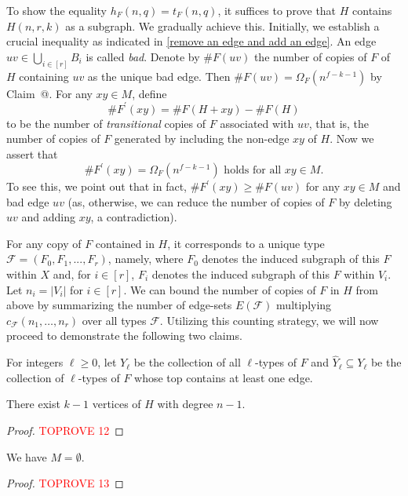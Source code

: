 \documentclass[10pt]{article}
\makeatletter
\newcommand*{\rom}[1]{\expandafter\@slowromancap\romannumeral #1@}
\makeatother
\begin{document}
To show the equality $h_F(n,q)=t_F(n,q)$, it suffices to prove that $H$ contains $H(n,r,k)$ as a subgraph.
We gradually achieve this.
Initially, we establish a crucial inequality as indicated in \eqref{remove an edge and add an edge}.
An edge $uv\in \bigcup_{i\in [r]} B_i$ is called {\it bad}.
Denote by $\#F(uv)$ the number of copies of $F$ of $H$ containing $uv$ as the unique bad edge.
Then $\#F(uv)=\Omega_F(n^{f-k-1})$ by Claim~\rom{3}.
For any $xy\in M$, define
$$\# F^\prime(xy)=\#F(H+xy)- \#F(H)$$
to be the number of {\it transitional} copies of $F$ associated with $uv$, that is, the number of copies of $F$ generated by including the non-edge $xy$ of $H$.
Now we assert that
\begin{equation}\label{remove an edge and add an edge}
\# F^\prime (xy)=\Omega_F(n^{f-k-1}) \mbox{ holds for all $xy\in M$}.
 \end{equation}
To see this, we point out that in fact, $\# F^\prime (xy)\geq \# F(uv)$ for any $xy\in M$ and bad edge $uv$
(as, otherwise, we can reduce the number of copies of $F$ by deleting $uv$ and adding $xy$, a contradiction).


For any copy of $F$ contained in $H$, it corresponds to a unique type $\mathcal{F}=(F_0,F_1,...,F_r)$, namely,
where $F_0$ denotes the induced subgraph of this $F$ within $X$ and, for $i\in [r]$, $F_i$ denotes the induced subgraph of this $F$ within $V_i$.
Let $n_i=|V_i|$ for $i\in [r]$.
We can bound the number of copies of $F$ in $H$ from above by summarizing the number of edge-sets $E(\mathcal{F})$ multiplying $c_{\mathcal{F}}(n_1,\ldots,n_r)$ over all types $\mathcal{F}$.
Utilizing this counting strategy, we will now proceed to demonstrate the following two claims.

For integers $\ell\geq 0$, let $Y_\ell$ be the collection of all $\ell$-types of $F$ and $\widehat{Y}_\ell \subseteq Y_\ell$ be the collection of $\ell$-types of $F$ whose top contains at least one edge.

\medskip

\noindent{\bf Claim \rom{4}.} There exist $k-1$ vertices of $H$ with degree $n-1$.


\begin{proof}\textcolor{red}{TOPROVE 12}\end{proof}


\noindent{\bf Claim \rom{5}.} We have $M=\emptyset$.

\begin{proof}\textcolor{red}{TOPROVE 13}\end{proof}
\end{document}
